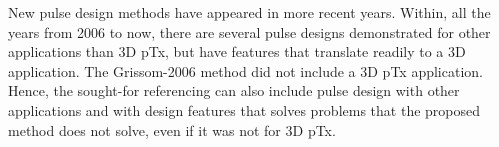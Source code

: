 \documentclass[11pt]{article}
\begin{document}
New pulse design methods have appeared in more recent years. Within, all the years from 2006 to now, there are several pulse designs demonstrated for other applications than 3D pTx, but have features that translate readily to a 3D application. The Grissom-2006 method did not include a 3D pTx application. Hence, the sought-for referencing can also include pulse design with other applications and with design features that solves problems that the proposed method does not solve, even if it was not for 3D pTx.
\\[0.2em]
\indent{\it \textcolor{blue}{While we are above our word count and cannot add a broad overview of different parallel transmit pulse design methods
to the Introduction,
we have added 10 more citations to the work including two review articles on parallel transmission (Deniz 2019 and Padormo 2015).
We also added brief Discussion on possible extensions of the method for large-tip-angle and VERSE parallel transmit pulse designs.}}
\\[1.2em]
\end{document}
